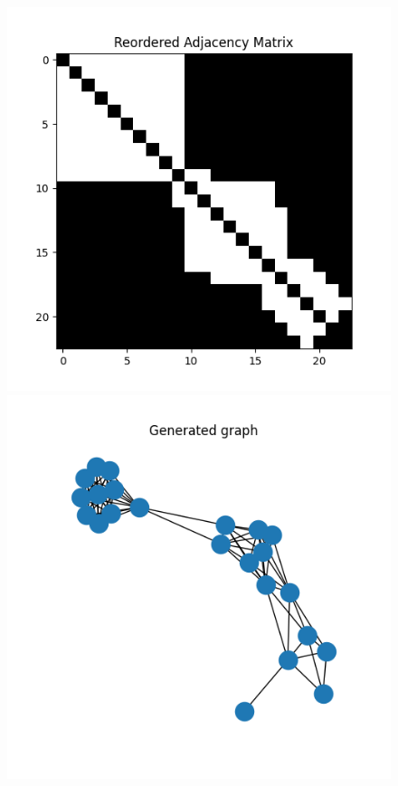 \documentclass[a4paper]{article}
\begin{document}
\begin{figure}[H]
    \centering
    \begin{minipage}{.45\textwidth}
      \includegraphics[width=0.7\linewidth]{figures/graph_00_adjacency_matrix.png}
    \end{minipage}\hfill
    \begin{minipage}{.45\textwidth}
      \includegraphics[width=0.7\linewidth]{figures/graph_00_generated_graph.png}
    \end{minipage}
  

\end{figure}
\end{document}
